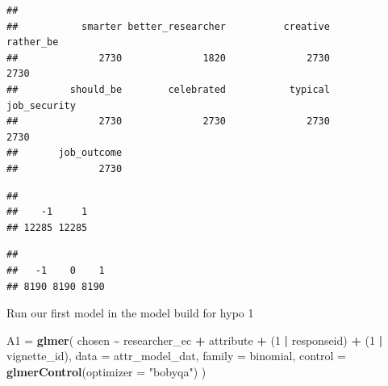 \documentclass[
]{article}
\newenvironment{Shaded}{\begin{snugshade}}{\end{snugshade}}
\newcommand{\AttributeTok}[1]{\textcolor[rgb]{0.13,0.29,0.53}{#1}}
\newcommand{\DecValTok}[1]{\textcolor[rgb]{0.00,0.00,0.81}{#1}}
\newcommand{\FunctionTok}[1]{\textcolor[rgb]{0.13,0.29,0.53}{\textbf{#1}}}
\newcommand{\NormalTok}[1]{#1}
\newcommand{\OtherTok}[1]{\textcolor[rgb]{0.56,0.35,0.01}{#1}}
\newcommand{\SpecialCharTok}[1]{\textcolor[rgb]{0.81,0.36,0.00}{\textbf{#1}}}
\newcommand{\StringTok}[1]{\textcolor[rgb]{0.31,0.60,0.02}{#1}}
\begin{document}
\begin{Shaded}
\end{Shaded}

\begin{verbatim}
## 
##           smarter better_researcher          creative         rather_be 
##              2730              1820              2730              2730 
##         should_be        celebrated           typical      job_security 
##              2730              2730              2730              2730 
##       job_outcome 
##              2730
\end{verbatim}

\begin{Shaded}
\end{Shaded}

\begin{verbatim}
## 
##    -1     1 
## 12285 12285
\end{verbatim}

\begin{Shaded}
\end{Shaded}

\begin{verbatim}
## 
##   -1    0    1 
## 8190 8190 8190
\end{verbatim}

Run our first model in the model build for hypo 1

\begin{Shaded}
\begin{Highlighting}[]
\NormalTok{A1 }\OtherTok{=} \FunctionTok{glmer}\NormalTok{(}
\NormalTok{  chosen }\SpecialCharTok{\textasciitilde{}}\NormalTok{ researcher\_ec }\SpecialCharTok{+}\NormalTok{ attribute }\SpecialCharTok{+}
\NormalTok{    (}\DecValTok{1} \SpecialCharTok{|}\NormalTok{ responseid) }\SpecialCharTok{+}\NormalTok{ (}\DecValTok{1} \SpecialCharTok{|}\NormalTok{ vignette\_id),}
  \AttributeTok{data =}\NormalTok{ attr\_model\_dat,}
  \AttributeTok{family =}\NormalTok{ binomial,}
  \AttributeTok{control =} \FunctionTok{glmerControl}\NormalTok{(}\AttributeTok{optimizer =} \StringTok{"bobyqa"}\NormalTok{)}
\NormalTok{)}
\end{Highlighting}
\end{Shaded}
\end{document}
